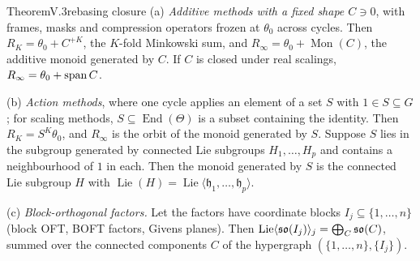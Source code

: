 \begin{restate}{Theorem}{V.3}{rebasing closure}
(a) \emph{Additive methods with a fixed shape $C\ni0$}, with frames, masks and compression operators frozen at $\theta_0$
across cycles. Then $R_K=\theta_0+C^{+K}$, the $K$-fold Minkowski sum, and $R_\infty=\theta_0+\operatorname{Mon}(C)$, the
additive monoid generated by $C$. If $C$ is closed under real scalings, $R_\infty=\theta_0+\operatorname{span} C$.

(b) \emph{Action methods}, where one cycle applies an element of a set $S$ with $1\in S\subseteq G$; for scaling methods,
$S\subseteq\operatorname{End}(\Theta)$ is a subset containing the identity. Then $R_K=S^K\theta_0$, and $R_\infty$ is the
orbit of the monoid generated by $S$. Suppose $S$ lies in the subgroup generated by connected Lie subgroups
$H_1,\dots,H_p$ and contains a neighbourhood of $1$ in each. Then the monoid generated by $S$ is the connected Lie subgroup
$H$ with $\operatorname{Lie}(H)=\operatorname{Lie}\langle\mathfrak h_1,\dots,\mathfrak h_p\rangle$.

(c) \emph{Block-orthogonal factors.} Let the factors have coordinate blocks $I_j\subseteq\{1,\dots,n\}$ (block OFT, BOFT
factors, Givens planes). Then $\operatorname{Lie}\langle\mathfrak{so}(I_j)\rangle_j=\bigoplus_C\mathfrak{so}(C)$, summed over the connected
components $C$ of the hypergraph $(\{1,\dots,n\},\{I_j\})$.


\end{restate}

